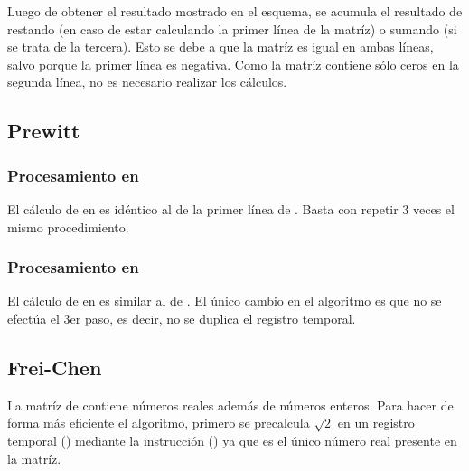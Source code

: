 Luego de obtener el resultado mostrado en el esquema, se acumula el resultado de  restando (en caso de estar calculando la primer 
línea de la matríz) o sumando (si se trata de la tercera). Esto se debe a que la matríz es igual en ambas líneas, salvo porque la primer línea es 
negativa. Como la matríz contiene sólo ceros en la segunda línea, no es necesario realizar los cálculos. 

\vspace{5mm}
\subsection{Prewitt}
\subsubsection{Procesamiento en }
	El cálculo de  en  es idéntico al de la primer línea de . Basta con repetir 3 veces el mismo
procedimiento.

\subsubsection{Procesamiento en }
	El cálculo de  en  es similar al de . El único cambio en el algoritmo es que no se efectúa el 3er
paso, es decir, no se duplica el registro temporal.

\vspace{5mm}
\subsection{Frei-Chen}
	La matríz de  contiene números reales además de números enteros. Para hacer de forma más eficiente el algoritmo, 
primero se precalcula $\sqrt{2}$ en un registro temporal () mediante la instrucción  () ya que es el único número real presente en la matríz.

\vspace{5mm}
\begin{center}
\end{center}

